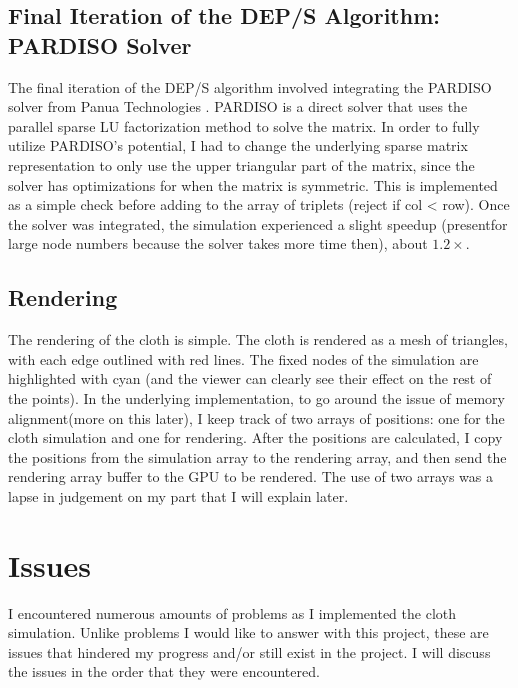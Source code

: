 \documentclass[letterpaper, 10 pt, conference]{ieeeconf}  %
\begin{document}
\subsection{Final Iteration of the DEP/S Algorithm: PARDISO Solver}
The final iteration of the DEP/S algorithm involved integrating the PARDISO solver from Panua Technologies \cite{Pasadakis2023} \cite{EFTEKHARI2021101389} \cite{gaedkemerzhäuser2022}. PARDISO is a direct solver that uses the parallel sparse LU factorization method to solve the matrix. In order to fully utilize PARDISO's potential, I had to change the underlying sparse matrix representation to only use the upper triangular part of the matrix, since the solver has optimizations for when the matrix is symmetric. This is implemented as a simple check before adding to the array of triplets (reject if col < row). Once the solver was integrated, the simulation experienced a slight speedup (presentfor large node numbers because the solver takes more time then), about $1.2\times$.

\subsection{Rendering}
The rendering of the cloth is simple. The cloth is rendered as a mesh of triangles, with each edge outlined with red lines. The fixed nodes of the simulation are highlighted with cyan (and the viewer can clearly see their effect on the rest of the points). In the underlying implementation, to go around the issue of memory alignment(more on this later), I keep track of two arrays of positions: one for the cloth simulation and one for rendering. After the positions are calculated, I copy the positions from the simulation array to the rendering array, and then send the rendering array buffer to the GPU to be rendered. The use of two arrays was a lapse in judgement on my part that I will explain later. 


\section{Issues}
        I encountered numerous amounts of problems as I implemented the cloth simulation. Unlike problems I would like to answer with this project, these are issues that hindered my progress and/or still exist in the project. I will discuss the issues in the order that they were encountered.
\end{document}
